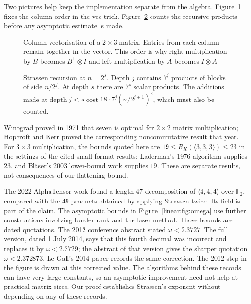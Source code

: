 Two pictures help keep the implementation separate from the algebra. Figure~\ref{fig:v10new-ch02-vectorization} fixes the column order in the vec trick. Figure~\ref{fig:v10new-ch02-recursion} counts the recursive products before any asymptotic estimate is made.

\begin{figure}[ht]
\centering
{}
\caption{Column vectorisation of a $2\times3$ matrix. Entries from each column remain together in the vector. This order is why right multiplication by $B$ becomes $B^{\mathsf T}\otimes I$ and left multiplication by $A$ becomes $I\otimes A$.}
\label{fig:v10new-ch02-vectorization}
\end{figure}

\begin{figure}[ht]
\centering
{}
\caption{Strassen recursion at $n=2^s$. Depth $j$ contains $7^j$ products of blocks of side $n/2^j$. At depth $s$ there are $7^s$ scalar products. The additions made at depth $j<s$ cost $18\cdot7^j(n/2^{j+1})^2$, which must also be counted.}
\label{fig:v10new-ch02-recursion}
\end{figure}

\begin{remark}
Winograd proved in 1971 that seven is optimal for $2\times2$ matrix multiplication; Hopcroft and Kerr proved the corresponding noncommutative result that year. For $3\times3$ multiplication, the bounds quoted here are $19\le R_K(\langle3,3,3\rangle)\le23$ in the settings of the cited small-format results: Laderman's 1976 algorithm supplies $23$, and Bl\"aser's 2003 lower-bound work supplies $19$. These are separate results, not consequences of our flattening bound.

The 2022 AlphaTensor work found a length-$47$ decomposition of $\langle4,4,4\rangle$ over $\mathbb F_2$, compared with the $49$ products obtained by applying Strassen twice. Its field is part of the claim. The asymptotic bounds in Figure~\ref{linear:fig:omega} use further constructions involving border rank and the laser method. Those bounds are dated quotations. The 2012 conference abstract stated $\omega<2.3727$. The full version, dated 1 July 2014, says that this fourth decimal was incorrect and replaces it by $\omega<2.3729$; the abstract of that version gives the sharper quotation $\omega<2.372873$. Le Gall's 2014 paper records the same correction. The 2012 step in the figure is drawn at this corrected value. The algorithms behind these records can have very large constants, so an asymptotic improvement need not help at practical matrix sizes. Our proof establishes Strassen's exponent without depending on any of these records.
\end{remark}


